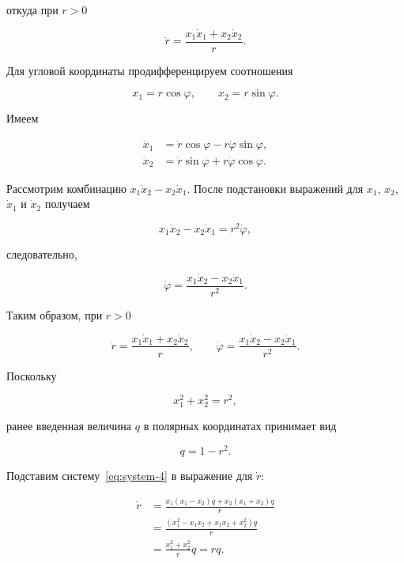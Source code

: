 откуда при $r>0$

\begin{equation}
  \dot r=\frac{x_1\dot x_1+x_2\dot x_2}{r}.
\end{equation}

Для угловой координаты продифференцируем соотношения

\[
x_1=r\cos\varphi,\qquad x_2=r\sin\varphi.
\]

Имеем

\begin{equation}
  \begin{aligned}
    \dot x_1&=\dot r\cos\varphi-r\dot\varphi\sin\varphi,\\
    \dot x_2&=\dot r\sin\varphi+r\dot\varphi\cos\varphi.
  \end{aligned}
\end{equation}

Рассмотрим комбинацию $x_1\dot x_2-x_2\dot x_1$. После подстановки
выражений для $x_1$, $x_2$, $\dot x_1$ и $\dot x_2$ получаем

\begin{equation}
  x_1\dot x_2-x_2\dot x_1
  =r^2\dot\varphi,
\end{equation}

следовательно,

\begin{equation}
  \dot\varphi=
  \frac{x_1\dot x_2-x_2\dot x_1}{r^2}.
\end{equation}

Таким образом, при $r>0$

\begin{equation}
  \dot r=\frac{x_1\dot x_1+x_2\dot x_2}{r},\qquad
  \dot\varphi=\frac{x_1\dot x_2-x_2\dot x_1}{r^2}.
\end{equation}

Поскольку

\[
x_1^2+x_2^2=r^2,
\]

ранее введенная величина $q$ в полярных координатах принимает вид

\begin{equation}
  q=1-r^2.
\end{equation}

Подставим систему~\eqref{eq:system-4} в выражение для $\dot r$:

\begin{equation}
  \begin{aligned}
    \dot r
    &=
    \frac{
      x_1(x_1-x_2)q+
      x_2(x_1+x_2)q
    }{r}\\
    &=
    \frac{
      \left(
        x_1^2-x_1x_2+x_1x_2+x_2^2
      \right)q
    }{r}\\
    &=
    \frac{x_1^2+x_2^2}{r}q
    =rq.
  \end{aligned}
\end{equation}

